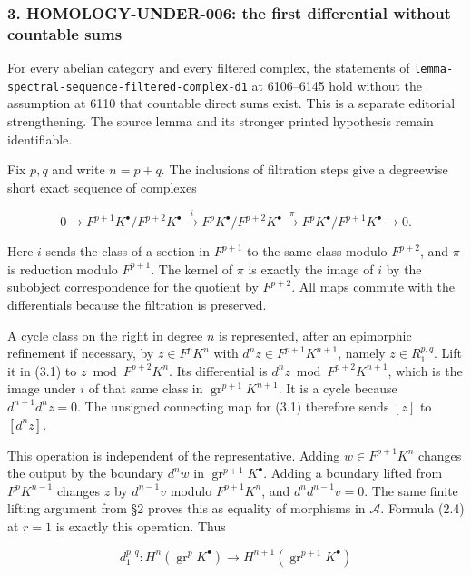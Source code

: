 \subsubsection{3. HOMOLOGY-UNDER-006: the first differential without countable sums}\label{homology-under-006-the-first-differential-without-countable-sums}

For every abelian category and every filtered complex, the statements of \texttt{lemma-spectral-sequence-filtered-complex-d1} at 6106--6145 hold without the assumption at 6110 that countable direct sums exist. This is a separate editorial strengthening. The source lemma and its stronger printed hypothesis remain identifiable.

Fix \(p,q\) and write \(n=p+q\). The inclusions of filtration steps give a degreewise short exact sequence of complexes

\[
0\longrightarrow F^{p+1}K^\bullet/F^{p+2}K^\bullet
\xrightarrow{i}F^pK^\bullet/F^{p+2}K^\bullet
\xrightarrow{\pi}F^pK^\bullet/F^{p+1}K^\bullet
\longrightarrow0.                         \tag{3.1}
\]

Here \(i\) sends the class of a section in \(F^{p+1}\) to the same class modulo \(F^{p+2}\), and \(\pi\) is reduction modulo \(F^{p+1}\). The kernel of \(\pi\) is exactly the image of \(i\) by the subobject correspondence for the quotient by \(F^{p+2}\). All maps commute with the differentials because the filtration is preserved.

A cycle class on the right in degree \(n\) is represented, after an epimorphic refinement if necessary, by \(z\in F^pK^n\) with \(d^nz\in F^{p+1}K^{n+1}\), namely \(z\in R_1^{p,q}\). Lift it in (3.1) to \(z\bmod F^{p+2}K^n\). Its differential is \(d^nz\bmod F^{p+2}K^{n+1}\), which is the image under \(i\) of that same class in \(\operatorname{gr}^{p+1}K^{n+1}\). It is a cycle because \(d^{n+1}d^nz=0\). The unsigned connecting map for (3.1) therefore sends \([z]\) to \([d^nz]\).

This operation is independent of the representative. Adding \(w\in F^{p+1}K^n\) changes the output by the boundary \(d^nw\) in \(\operatorname{gr}^{p+1}K^\bullet\). Adding a boundary lifted from \(F^pK^{n-1}\) changes \(z\) by \(d^{n-1}v\) modulo \(F^{p+1}K^n\), and \(d^nd^{n-1}v=0\). The same finite lifting argument from §2 proves this as equality of morphisms in \(\mathcal A\). Formula (2.4) at \(r=1\) is exactly this operation. Thus

\[
d_1^{p,q}:H^n(\operatorname{gr}^pK^\bullet)
\longrightarrow H^{n+1}(\operatorname{gr}^{p+1}K^\bullet)
\]


